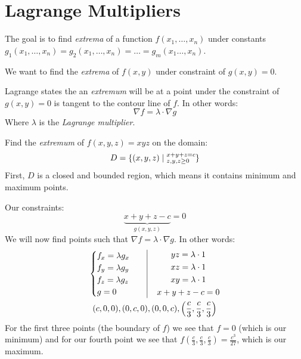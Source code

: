 \documentclass[00_complete]{subfiles}
\begin{document}
\section{Lagrange Multipliers}
The goal is to find \emph{extrema} of a function $f(x_1,\dots,x_n)$ under
constants $g_1(x_1,\dots,x_n)=g_2(x_1,\dots,x_n)=\dots=g_m(x_1\dots,x_n)$.
\begin{example}
    We want to find the \emph{extrema} of $f(x,y)$ under constraint of
    $g(x,y)=0$.

    Lagrange states the an \emph{extremum} will be at a point under the
    constraint of $g(x,y)=0$ is tangent to the contour line of $f$. In other
    words:
    $$\nabla f = \lambda \cdot \nabla g$$
    Where $\lambda$ is the \emph{Lagrange multiplier}.
\end{example}
\begin{example}
    Find the \emph{extremum} of $f(x,y,z)=xyz$ on the domain:
    $$D=\{(x,y,z) \mid
    \begin{subarray}{m}
        x+y+z=c \\ z,y,z \geq 0
    \end{subarray}\}$$
    First, $D$ is a closed and bounded region, which means it contains minimum
    and maximum points.

    Our constraints:
    $$\underbrace{x+y+z-c}_{g(x,y,z)}=0$$
    We will now find points such that $\nabla f= \lambda \cdot \nabla g$. In
    other words:
    \begin{gather*}
    \begin{cases}
        f_x=\lambda g_x \\
        f_y=\lambda g_y \\
        f_z=\lambda g_z \\
        g=0
    \end{cases} \quad \vline \quad
    \begin{gathered}
        yz=\lambda \cdot 1 \\
        xz=\lambda \cdot 1 \\
        xy=\lambda \cdot 1 \\
        x+y+z -c=0
    \end{gathered} \\
    (c,0,0), (0,c,0), (0,0,c), \left(\frac{c}{3},\frac{c}{3},\frac{c}{3}\right)
    \end{gather*}
    For the first three points (the boundary of $f$) we see that $f=0$ (which
    is our minimum) and for our fourth point we see that
    $f(\frac{c}{3},\frac{c}{3},\frac{c}{3})=\frac{c^3}{27}$, which is our maximum.
\end{example}
\end{document}
